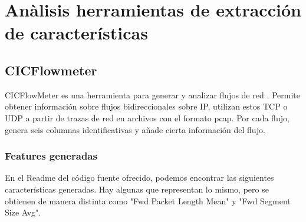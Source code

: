 \section{Anàlisis herramientas de extracción de características}

\subsection{CICFlowmeter}

CICFlowMeter es una herramienta para generar y analizar flujos de red \cite{cicflowpost}. Permite obtener información sobre flujos bidireccionales sobre IP, utilizan estos TCP o UDP a partir de trazas de red en archivos con el formato pcap. Por cada flujo, genera seis columnas identificativas y añade cierta información del flujo. 

\subsubsection{Features generadas}

En el Readme del código fuente ofrecido, podemos encontrar las siguientes características generadas. Hay algunas que representan lo mismo, pero se obtienen de manera distinta como "Fwd Packet Length Mean" y "Fwd Segment Size Avg".


